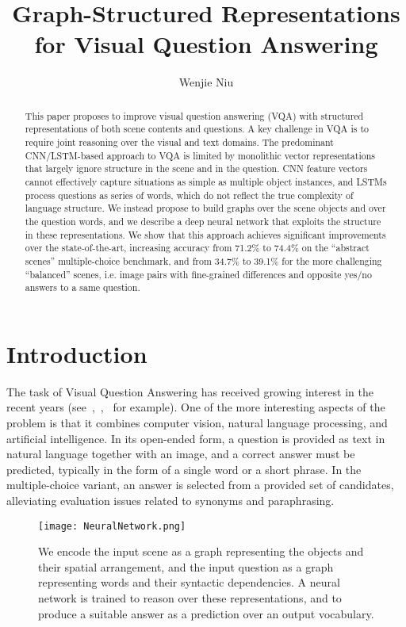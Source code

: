 \documentclass[10pt,twocolumn,letterpaper]{article}
\begin{document}
\title{Graph-Structured Representations for Visual Question Answering}
\author{Wenjie Niu}
\maketitle

\begin{abstract}
   This paper proposes to improve visual question answering
(VQA) with structured representations of both scene
contents and questions. A key challenge in VQA is to require
joint reasoning over the visual and text domains. The predominant
CNN/LSTM-based approach to VQA is limited by
monolithic vector representations that largely ignore structure
in the scene and in the question. CNN feature vectors
cannot effectively capture situations as simple as multiple
object instances, and LSTMs process questions as series
of words, which do not reflect the true complexity of language
structure. We instead propose to build graphs over
the scene objects and over the question words, and we describe
a deep neural network that exploits the structure in
these representations. We show that this approach achieves
significant improvements over the state-of-the-art, increasing
accuracy from 71.2\% to 74.4\% on the “abstract scenes”
multiple-choice benchmark, and from 34.7\% to 39.1\% for
the more challenging “balanced” scenes, i.e. image pairs
with fine-grained differences and opposite yes/no answers
to a same question.\cite{Teney_2017_CVPR}
\end{abstract}


\section{Introduction}
The task of Visual Question Answering has received
growing interest in the recent years (see~\cite{Malinowski2014A},~\cite{AntolALMBZP15},~\cite{WuTWSDH16} for example).
One of the more interesting aspects of the problem
is that it combines computer vision, natural language processing,
and artificial intelligence. In its open-ended form,
a question is provided as text in natural language together
with an image, and a correct answer must be predicted, typically
in the form of a single word or a short phrase. In the
multiple-choice variant, an answer is selected from a provided
set of candidates, alleviating evaluation issues related
to synonyms and paraphrasing.\par

\begin{figure}[H]
\begin{center}
\texttt{[image: NeuralNetwork.png]}
\end{center}
   \caption{We encode the input scene as a graph representing the
objects and their spatial arrangement, and the input question as a graph representing words and their syntactic dependencies. A neural network is trained to reason over these representations, and to produce a suitable answer as a prediction over an output vocabulary.}
\label{fig:NeuralNetwork}
\end{figure}
\end{document}
